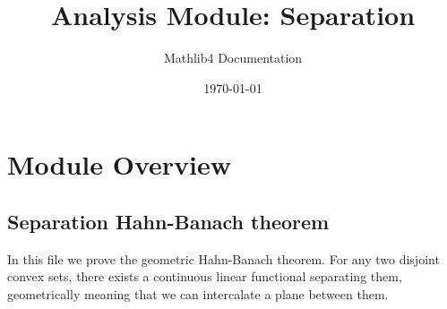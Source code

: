 \documentclass{article}
\title{Analysis Module: Separation}
\author{Mathlib4 Documentation}
\date{\today}
\theoremstyle{definition}
\begin{document}
\maketitle

\section{Module Overview}
\subsection{Separation Hahn-Banach theorem}

In this file we prove the geometric Hahn-Banach theorem. For any two disjoint convex sets, there
exists a continuous linear functional separating them, geometrically meaning that we can intercalate
a plane between them.
\end{document}
